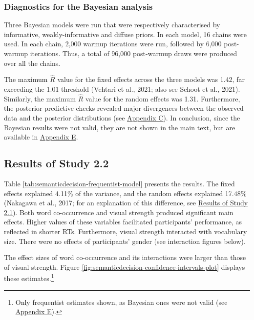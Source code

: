 \documentclass[
  12pt,
  man,floatsintext]{apa7}
\begin{document}
\hypertarget{diagnostics-for-the-bayesian-analysis-1}{%
\subsubsection{Diagnostics for the Bayesian analysis}\label{diagnostics-for-the-bayesian-analysis-1}}

Three Bayesian models were run that were respectively characterised by informative, weakly-informative and diffuse priors. In each model, 16 chains were used. In each chain, 2,000 warmup iterations were run, followed by 6,000 post-warmup iterations. Thus, a total of 96,000 post-warmup draws were produced over all the chains.

The maximum \(\widehat R\) value for the fixed effects across the three models was 1.42, far exceeding the 1.01 threshold (Vehtari et al., 2021; also see Schoot et al., 2021). Similarly, the maximum \(\widehat R\) value for the random effects was 1.31. Furthermore, the posterior predictive checks revealed major divergences between the observed data and the posterior distributions (see \protect\hyperlink{appendix-C-Bayesian-analysis-diagnostics}{\underline{Appendix C}}). In conclusion, since the Bayesian results were not valid, they are not shown in the main text, but are available in \protect\hyperlink{appendix-E-Bayesian-analysis-results}{\underline{Appendix E}}.

\hypertarget{results-of-study-2.2}{%
\subsection{Results of Study 2.2}\label{results-of-study-2.2}}

Table \ref{tab:semanticdecision-frequentist-model} presents the results. The fixed effects explained 4.11\% of the variance, and the random effects explained 17.48\% (Nakagawa et al., 2017; for an explanation of this difference, see \protect\hyperlink{semanticpriming-results}{\underline{Results of Study 2.1}}). Both word co-occurrence and visual strength produced significant main effects. Higher values of these variables facilitated participants' performance, as reflected in shorter RTs. Furthermore, visual strength interacted with vocabulary size. There were no effects of participants' gender (see interaction figures below).

The effect sizes of word co-occurrence and its interactions were larger than those of visual strength. Figure \ref{fig:semanticdecision-confidence-intervals-plot} displays these estimates.\footnote{Only frequentist estimates shown, as Bayesian ones were not valid (see \protect\hyperlink{appendix-E-Bayesian-analysis-results}{\underline{Appendix E}}).}
\end{document}
